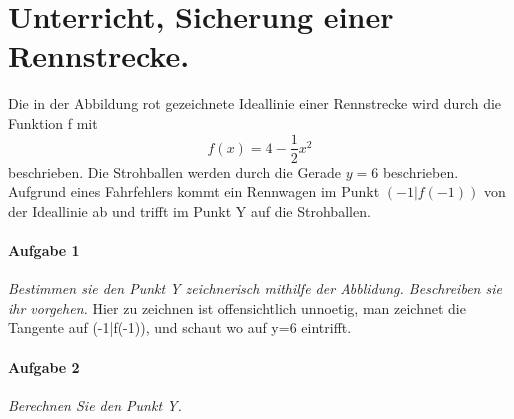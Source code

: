 \documentclass{report}
\begin{document}
\section{Unterricht, Sicherung einer Rennstrecke.}


Die in der Abbildung rot gezeichnete Ideallinie einer Rennstrecke wird durch
die Funktion f mit 
\[ f(x)=4-\frac{1}{2}x^2\]
beschrieben. Die Strohballen werden durch die Gerade $y=6$ beschrieben.
Aufgrund eines Fahrfehlers kommt ein Rennwagen im Punkt $(-1|f(-1))$ von der
Ideallinie ab und trifft im Punkt Y auf die Strohballen.

\paragraph{Aufgabe 1} \textit{Bestimmen sie den Punkt Y zeichnerisch mithilfe der Abblidung. Beschreiben sie ihr vorgehen.}
Hier zu zeichnen ist offensichtlich unnoetig, man zeichnet die Tangente auf (-1|f(-1)), und schaut wo auf y=6 eintrifft.


\paragraph{Aufgabe 2} \textit{Berechnen Sie den Punkt Y.}
\end{document}
